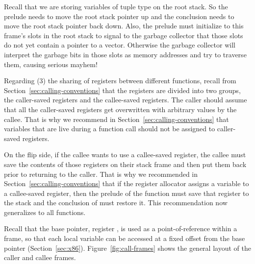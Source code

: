 \documentclass[7x10]{TimesAPriori_MIT}%
\begin{document}
Recall that we are storing variables of tuple type on the root stack.
So the prelude needs to move the root stack pointer  up and
the conclusion needs to move the root stack pointer back down.  Also,
the prelude must initialize to  this frame's slots in the root
stack to signal to the garbage collector that those slots do not yet
contain a pointer to a vector. Otherwise the garbage collector will
interpret the garbage bits in those slots as memory addresses and try
to traverse them, causing serious mayhem!

Regarding (3) the sharing of registers between different functions,
recall from Section~\ref{sec:calling-conventions} that the registers
are divided into two groups, the caller-saved registers and the
callee-saved registers. The caller should assume that all the
caller-saved registers get overwritten with arbitrary values by the
callee. That is why we recommend in
Section~\ref{sec:calling-conventions} that variables that are live
during a function call should not be assigned to caller-saved
registers.

On the flip side, if the callee wants to use a callee-saved register,
the callee must save the contents of those registers on their stack
frame and then put them back prior to returning to the caller.  That
is why we recommended in Section~\ref{sec:calling-conventions} that if
the register allocator assigns a variable to a callee-saved register,
then the prelude of the  function must save that register
to the stack and the conclusion of  must restore it.  This
recommendation now generalizes to all functions.

Recall that the base pointer, register , is used as a
point-of-reference within a frame, so that each local variable can be
accessed at a fixed offset from the base pointer
(Section~\ref{sec:x86}).
%
Figure~\ref{fig:call-frames} shows the general layout of the caller
and callee frames.
\end{document}
